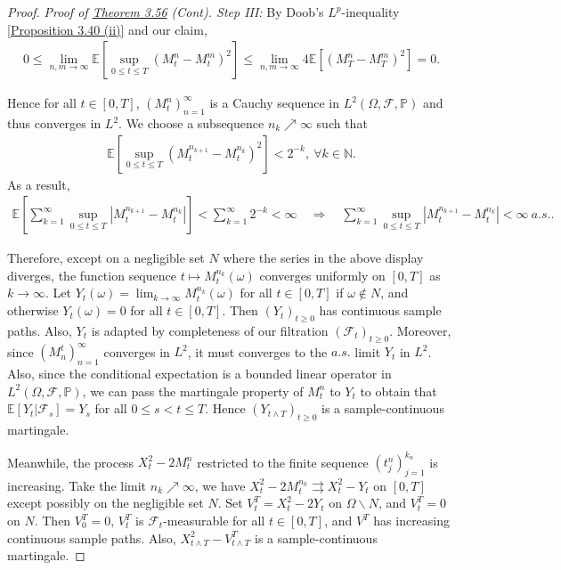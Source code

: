\documentclass{article}
\numberwithin{equation}{section}
\newcommand{\E}{\mathbb{E}}
\renewcommand{\P}{\mathbb{P}}
\theoremstyle{plain}
\theoremstyle{definition}
\begin{document}
\begin{proof}
\textit{Proof of \hyperref[thm:3.56]{Theorem 3.56} (Cont). Step III:} By Doob's $L^p$-inequality [\hyperref[prop:3.40]{Proposition 3.40 (ii)}] and our claim, 
\begin{align*}
	0\leq \lim_{n,m\to\infty}\E\left[\sup_{0\leq t\leq T}\left(M_t^n-M_t^m\right)^2\right] \leq \lim_{n,m\to\infty} 4\E\left[\left(M_T^n-M_T^m\right)^2\right] = 0.
\end{align*}

Hence for all $t\in[0,T]$, $(M_t^n)_{n=1}^\infty$ is a Cauchy sequence in $L^2(\Omega,\mathscr{F},\P)$ and thus converges in $L^2$. We choose a subsequence $n_k\nearrow\infty$ such that
\begin{align*}
	\E\left[\sup_{0\leq t\leq T}\left(M_t^{n_{k+1}}-M_t^{n_k}\right)^2\right] < 2^{-k},\ \forall k\in\mathbb{N}.
\end{align*}
As a result,
\begin{align*}
	\E\left[\sum_{k=1}^\infty\sup_{0\leq t\leq T}\left\vert M_t^{n_{k+1}}-M_t^{n_k}\right\vert\right] < \sum_{k=1}^\infty 2^{-k} < \infty\quad\Rightarrow\quad \sum_{k=1}^\infty\sup_{0\leq t\leq T}\left\vert M_t^{n_{k+1}}-M_t^{n_k}\right\vert < \infty\ \textit{a.s.}.
\end{align*}

Therefore, except on a negligible set $N$ where the series in the above display diverges, the function sequence $t\mapsto M_t^{n_k}(\omega)$ converges uniformly on $[0,T]$ as $k\to\infty$. Let $Y_t(\omega) = \lim_{k\to\infty}M_t^{n_k}(\omega)$ for all $t\in[0,T]$ if $\omega\notin N$, and otherwise $Y_t(\omega)=0$ for all $t\in[0,T]$. Then $(Y_t)_{t\geq 0}$ has continuous sample paths. Also, $Y_t$ is adapted by completeness of our filtration $(\mathscr{F}_t)_{t\geq 0}$. Moreover, since $(M_n^t)_{n=1}^\infty$ converges in $L^2$, it must converges to the $a.s.$ limit $Y_t$ in $L^2$. Also, since the conditional expectation is a bounded linear operator in $L^2(\Omega,\mathscr{F},\P)$, we can pass the martingale property of $M_t^n$ to $Y_t$ to obtain that $\E[Y_t|\mathscr{F}_s]=Y_s$ for all $0\leq s<t\leq T$. Hence $(Y_{t\wedge T})_{t\geq 0}$ is a sample-continuous martingale. 

Meanwhile, the process $X_t^2 - 2M_t^n$ restricted to the finite sequence $(t_j^n)_{j=1}^{k_n}$ is increasing. Take the limit $n_k\nearrow\infty$, we have $X_t^2-2M_t^{n_k}\rightrightarrows X_t^2-Y_t$ on $[0,T]$ except possibly on the negligible set $N$. Set $V_t^T = X_t^2-2Y_t$ on $\Omega\backslash N$, and $V_t^T=0$ on $N$. Then $V_0^T=0$, $V_t^T$ is $\mathscr{F}_t$-measurable for all $t\in[0,T]$, and $V^T$ has increasing continuous sample paths. Also, $X_{t\wedge T}^2-V_{t\wedge T}^T$ is a sample-continuous martingale. 


\end{proof}
\end{document}
